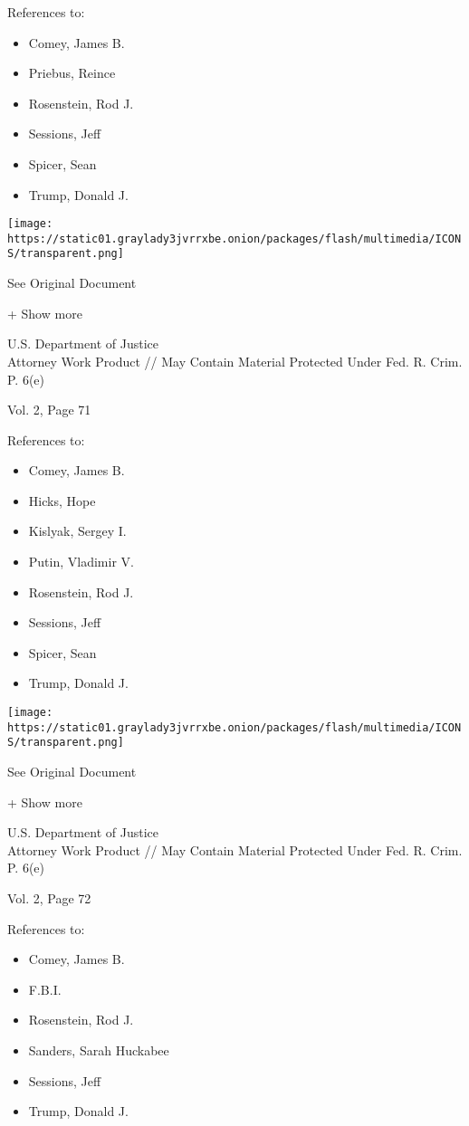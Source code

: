 References to:

\begin{itemize}
\tightlist
\item
  Comey, James B.
\item
  Priebus, Reince
\item
  Rosenstein, Rod J.
\item
  Sessions, Jeff
\item
  Spicer, Sean
\item
  Trump, Donald J.
\end{itemize}

\protect\hyperlink{}{}

\texttt{[image: https://static01.graylady3jvrrxbe.onion/packages/flash/multimedia/ICONS/transparent.png]}

See Original Document

+ Show more

U.S. Department of Justice\\
Attorney Work Product // May Contain Material Protected Under Fed. R.
Crim. P. 6(e)

Vol. 2, Page 71

References to:

\begin{itemize}
\tightlist
\item
  Comey, James B.
\item
  Hicks, Hope
\item
  Kislyak, Sergey I.
\item
  Putin, Vladimir V.
\item
  Rosenstein, Rod J.
\item
  Sessions, Jeff
\item
  Spicer, Sean
\item
  Trump, Donald J.
\end{itemize}

\protect\hyperlink{}{}

\texttt{[image: https://static01.graylady3jvrrxbe.onion/packages/flash/multimedia/ICONS/transparent.png]}

See Original Document

+ Show more

U.S. Department of Justice\\
Attorney Work Product // May Contain Material Protected Under Fed. R.
Crim. P. 6(e)

Vol. 2, Page 72

References to:

\begin{itemize}
\tightlist
\item
  Comey, James B.
\item
  F.B.I.
\item
  Rosenstein, Rod J.
\item
  Sanders, Sarah Huckabee
\item
  Sessions, Jeff
\item
  Trump, Donald J.
\end{itemize}

